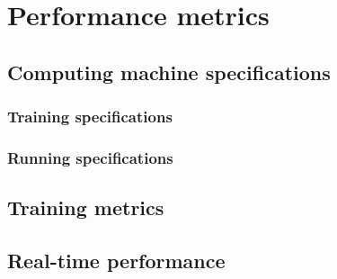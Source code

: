 \chapter{Performance metrics}
\label{chap:performance}

\section{Computing machine specifications}
\label{sec:performancesec1}

\subsection{Training specifications}
\label{sec:performancesec1subsec1}

\subsection{Running specifications}
\label{sec:performancesec1subsec2}

\section{Training metrics}
\label{sec:performancesec2}

\section{Real-time performance}
\label{sec:performancesec3}
